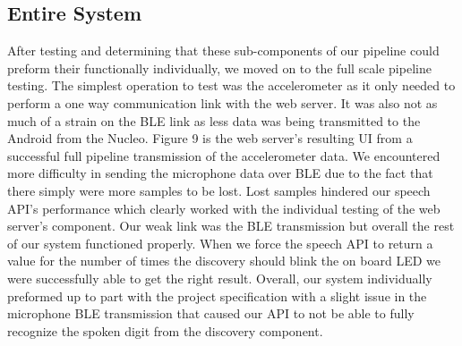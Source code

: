 \subsection{Entire System}
After testing and determining that these sub-components of our pipeline could preform their functionally individually, we moved on to the full scale pipeline testing. The simplest operation to test was the accelerometer as it only needed to perform a one way communication link with the web server. It was also not as much of a strain on the BLE link as less data was being transmitted to the Android from the Nucleo. Figure 9 is the web server's resulting UI from a successful full pipeline transmission of the accelerometer data. We encountered more difficulty in sending the microphone data over BLE due to the fact that there simply were more samples to be lost. Lost samples hindered our speech API's performance which clearly worked with the individual testing of the web server's component. Our weak link was the BLE transmission but overall the rest of our system functioned properly. When we force the speech API to return a value for the number of times the discovery should blink the on board LED we were successfully able to get the right result. Overall, our system individually preformed up to part with the project specification with a slight issue in the microphone BLE transmission that caused our API to not be able to fully recognize the spoken digit from the discovery component.